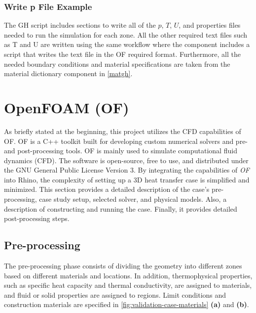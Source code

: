 \subsubsection{Write p File Example}
The \gls{GH} script includes sections to write all of the $p$, $T$, $U$, and properties files needed to run the simulation for each zone. All the other required text files such as T and U are written using the same workflow where the component includes a script that writes the text file in the \gls{OF} required format. Furthermore, all the needed boundary conditions and material specifications are taken from the material dictionary component in \cref{matgh}.


















\section[OpenFOAM]{OpenFOAM (OF)}
As briefly stated at the beginning, this project utilizes the CFD capabilities of  \gls{OF}.  \gls{OF} is a C++ toolkit built for developing custom numerical solvers and pre- and post-processing tools. \gls{OF} is mainly used to simulate computational fluid dynamics (CFD). The software is open-source, free to use, and distributed under the GNU General Public License Version 3.
By integrating the capabilities of \textit{OF} into Rhino, the complexity of setting up a 3D heat transfer case is simplified and minimized.
This section provides a detailed description of the case's pre-processing, case study setup, selected solver, and physical models. Also, a description of constructing and running the case. Finally, it provides detailed post-processing steps.



\subsection{Pre-processing}
The pre-processing phase consists of dividing the geometry into different zones based on different materials and locations. In addition, thermophysical properties, such as specific heat capacity and thermal conductivity, are assigned to materials, and fluid or solid properties are assigned to regions. Limit conditions and construction materials are specified in \cref{fig:validation-case-materials} \textbf{(a)} and \textbf{(b)}. 


